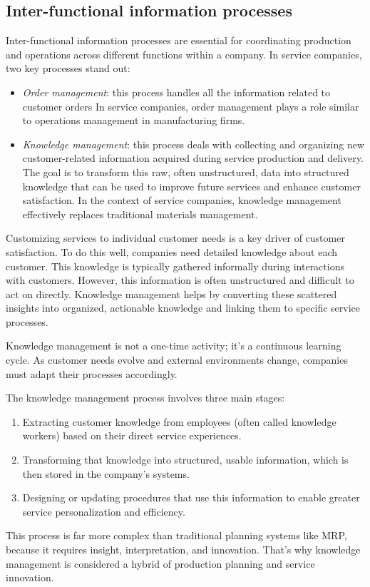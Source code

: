 \subsection{Inter-functional information processes}
Inter-functional information processes are essential for coordinating production and operations across different functions within a company. 
In service companies, two key processes stand out:
\begin{itemize}
    \item \textit{Order management}: this process handles all the information related to customer orders
        In service companies, order management plays a role similar to operations management in manufacturing firms.
    \item \textit{Knowledge management}: this process deals with collecting and organizing new customer-related information acquired during service production and delivery. 
        The goal is to transform this raw, often unstructured, data into structured knowledge that can be used to improve future services and enhance customer satisfaction. 
        In the context of service companies, knowledge management effectively replaces traditional materials management.
\end{itemize}
\noindent Customizing services to individual customer needs is a key driver of customer satisfaction. 
To do this well, companies need detailed knowledge about each customer.
This knowledge is typically gathered informally during interactions with customers. 
However, this information is often unstructured and difficult to act on directly.
Knowledge management helps by converting these scattered insights into organized, actionable knowledge and linking them to specific service processes.

Knowledge management is not a one-time activity; it's a continuous learning cycle. 
As customer needs evolve and external environments change, companies must adapt their processes accordingly.

The knowledge management process involves three main stages:
\begin{enumerate}
    \item Extracting customer knowledge from employees (often called knowledge workers) based on their direct service experiences.
    \item Transforming that knowledge into structured, usable information, which is then stored in the company's systems. 
    \item Designing or updating procedures that use this information to enable greater service personalization and efficiency.
\end{enumerate}
\noindent This process is far more complex than traditional planning systems like MRP, because it requires insight, interpretation, and innovation. 
That's why knowledge management is considered a hybrid of production planning and service innovation.

